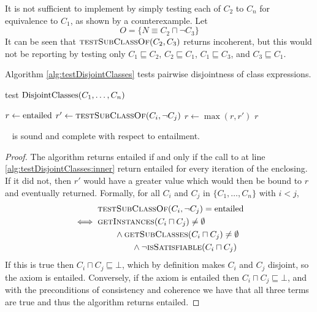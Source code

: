 \documentclass[paper.tex]{subfiles}
\begin{document}
It is not sufficient to implement  by simply testing each of $C_2$ to $C_n$ for equivalence to $C_1$, as shown by a counterexample.  Let
\[ O = \{ N \equiv C_2 \sqcap \neg C_3 \} \]
It can be seen that $\Call{testSubClassOf}{C_2, C_3}$ returns incoherent, but this would not be reporting by testing only $C_1 \sqsubseteq C_2$, $C_2 \sqsubseteq C_1$, $C_1 \sqsubseteq C_3$, and $C_3 \sqsubseteq C_1$.

Algorithm \ref{alg:testDisjointClasses} tests pairwise disjointness of class expressions.

\begin{algorithm}[H]
  \caption{test $\mathrm{DisjointClasses}(C_1, \ldots, C_n)$}
  \label{alg:testDisjointClasses}
  \begin{algorithmic}[1]
    \raggedright
      \State $r \gets \mathrm{entailed}$
          \State $r' \gets \Call{testSubClassOf}{C_i, \neg C_j}$
          \label{alg:testDisjointClasses:inner}
          \State $r \gets \max(r, r')$
        \EndFor
      \EndFor
      \State \Return $r$
    \EndFunction
  \end{algorithmic}
\end{algorithm}

\begin{proposition}
  \sloppy~
   is sound and complete with respect to entailment.
\end{proposition}
\begin{proof}
  The algorithm returns entailed if and only if the call to  at line \ref{alg:testDisjointClasses:inner} return entailed for every iteration of the enclosing.  If it did not, then $r'$ would have a greater value which would then be bound to $r$ and eventually returned.  Formally, for all $C_i$ and $C_j$ in $\{C_1, \ldots, C_n\}$ with $i < j$,
  \begin{align*}
    & \Call{testSubClassOf}{C_i, \neg C_j} = \entailed \\
    \iff{}& \Call{getInstances}{C_i \sqcap C_j} \ne \emptyset \\
      & \qquad \land \Call{getSubClasses}{C_i \sqcap C_j} \ne \emptyset \\
      & \qquad\qquad \land \neg \Call{isSatisfiable}{C_i \sqcap C_j}
  \end{align*}
  If this is true then $C_i \sqcap C_j \sqsubseteq \bot$, which by definition makes $C_i$ and $C_j$ disjoint, so the axiom is entailed.  Conversely, if the axiom is entailed then $C_i \sqcap C_j \sqsubseteq \bot$, and with the preconditions of consistency and coherence we have that all three terms are true and thus the algorithm returns entailed.
\end{proof}
\end{document}
